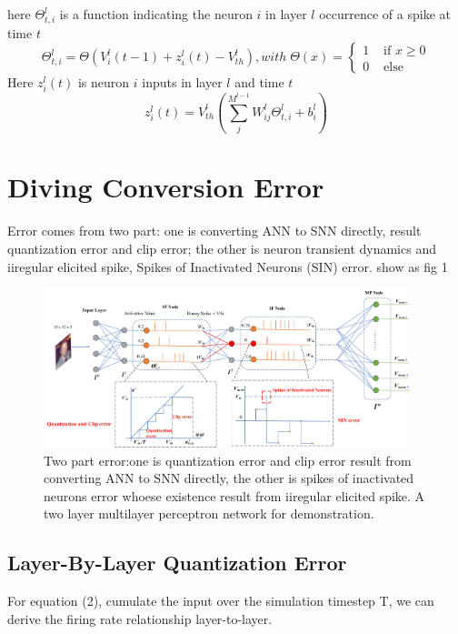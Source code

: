 \documentclass{article}
\begin{document}
here $\Theta_{t,i}^{l}$ is a function indicating the neuron $i$ in layer $l$ occurrence of a spike at time $t$
\begin{equation}
  \Theta_{t, i}^{l}=\Theta\left(V_{i}^{l}(t-1)+z_{i}^{l}(t)-V_{th}^l\right), with \; \Theta(x)= \begin{cases}1 & \text { if } x \geq 0 \\ 0 & \text { else }\end{cases}
\end{equation}
Here $z_i^l(t)$ is neuron $i$ inputs in layer $l$ and time $t$
\begin{equation}
  z_{i}^{l}(t) = V_{th}^l\left(\sum_j^{M^{l-1}}W_{ij}^l\Theta_{t,i}^{l}+b_i^l\right)
\end{equation}

\section{Diving Conversion Error}
Error comes from two part: one is converting ANN to SNN directly, result quantization error and clip error; the other is neuron transient dynamics and iiregular elicited spike, Spikes of Inactivated Neurons
(SIN) error.
show as fig 1
\begin{figure}[htbp]
  \centering
  \includegraphics[width=0.95\textwidth]{error.pdf}
  \caption{Two part error:one is quantization error and clip error result from converting ANN to SNN directly, the other is spikes of inactivated neurons error whoese existence result from iiregular elicited spike. A two layer multilayer perceptron network for demonstration.}
\end{figure}
\subsection{Layer-By-Layer Quantization Error}

For equation (2), cumulate the input over the simulation timestep T, we can derive the firing rate relationship layer-to-layer.
\end{document}
